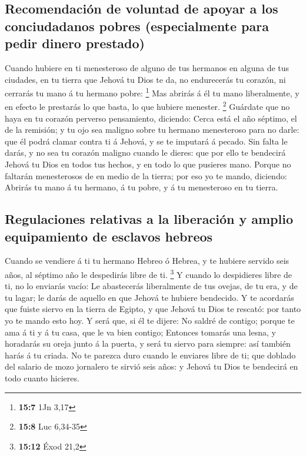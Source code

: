 \hypertarget{recomendaciuxf3n-de-voluntad-de-apoyar-a-los-conciudadanos-pobres-especialmente-para-pedir-dinero-prestado}{%
\subsection{Recomendación de voluntad de apoyar a los conciudadanos
pobres (especialmente para pedir dinero
prestado)}\label{recomendaciuxf3n-de-voluntad-de-apoyar-a-los-conciudadanos-pobres-especialmente-para-pedir-dinero-prestado}}

 Cuando hubiere en ti menesteroso de alguno de tus hermanos
en alguna de tus ciudades, en tu tierra que Jehová tu Dios te da, no
endurecerás tu corazón, ni cerrarás tu mano á tu hermano pobre:
\footnote{\textbf{15:7} 1Jn 3,17}  Mas abrirás á él tu mano
liberalmente, y en efecto le prestarás lo que basta, lo que hubiere
menester. \footnote{\textbf{15:8} Luc 6,34-35}  Guárdate que
no haya en tu corazón perverso pensamiento, diciendo: Cerca está el año
séptimo, el de la remisión; y tu ojo sea maligno sobre tu hermano
menesteroso para no darle: que él podrá clamar contra ti á Jehová, y se
te imputará á pecado.  Sin falta le darás, y no sea tu
corazón maligno cuando le dieres: que por ello te bendecirá Jehová tu
Dios en todos tus hechos, y en todo lo que pusieres mano. 
Porque no faltarán menesterosos de en medio de la tierra; por eso yo te
mando, diciendo: Abrirás tu mano á tu hermano, á tu pobre, y á tu
menesteroso en tu tierra.

\hypertarget{regulaciones-relativas-a-la-liberaciuxf3n-y-amplio-equipamiento-de-esclavos-hebreos}{%
\subsection{Regulaciones relativas a la liberación y amplio equipamiento
de esclavos
hebreos}\label{regulaciones-relativas-a-la-liberaciuxf3n-y-amplio-equipamiento-de-esclavos-hebreos}}

 Cuando se vendiere á ti tu hermano Hebreo ó Hebrea, y te
hubiere servido seis años, al séptimo año le despedirás libre de ti.
\footnote{\textbf{15:12} Éxod 21,2}  Y cuando lo
despidieres libre de ti, no lo enviarás vacío:  Le
abastecerás liberalmente de tus ovejas, de tu era, y de tu lagar; le
darás de aquello en que Jehová te hubiere bendecido.  Y te
acordarás que fuiste siervo en la tierra de Egipto, y que Jehová tu Dios
te rescató: por tanto yo te mando esto hoy.  Y será que, si
él te dijere: No saldré de contigo; porque te ama á ti y á tu casa, que
le va bien contigo;  Entonces tomarás una lesna, y
horadarás su oreja junto á la puerta, y será tu siervo para siempre: así
también harás á tu criada.  No te parezca duro cuando le
enviares libre de ti; que doblado del salario de mozo jornalero te
sirvió seis años: y Jehová tu Dios te bendecirá en todo cuanto hicieres.

